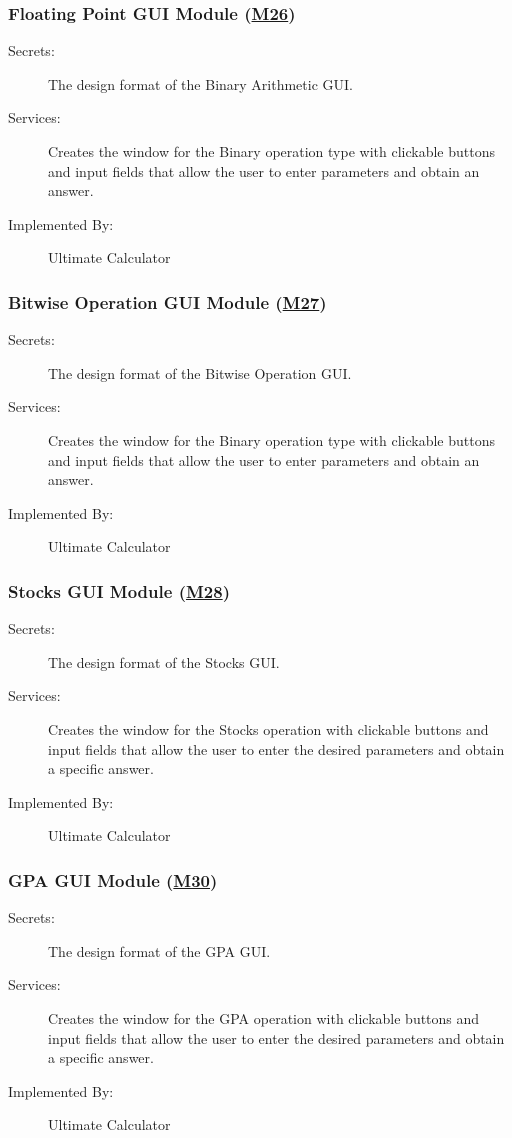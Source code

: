 \documentclass[12pt, titlepage]{article}
\begin{document}
\subsubsection{Floating Point GUI Module (\hyperref[m26]{M26})}
\begin{description}
\item[Secrets:]The design format of the Binary Arithmetic GUI.
\item[Services:] Creates the window for the Binary operation type with clickable buttons and input fields that allow the user to enter parameters and obtain an answer.
\item[Implemented By:] Ultimate Calculator
\end{description}

\subsubsection{Bitwise Operation GUI Module (\hyperref[m27]{M27})}
\begin{description}
\item[Secrets:]The design format of the Bitwise Operation GUI.
\item[Services:] Creates the window for the Binary operation type with clickable buttons and input fields that allow the user to enter parameters and obtain an answer.
\item[Implemented By:] Ultimate Calculator
\end{description}

\subsubsection{Stocks GUI Module (\hyperref[m28]{M28})}
\begin{description}
\item[Secrets:]The design format of the Stocks GUI.
\item[Services:] Creates the window for the Stocks operation with clickable buttons and input fields that allow the user to enter the desired parameters and obtain a specific answer.
\item[Implemented By:] Ultimate Calculator
\end{description}

\subsubsection{GPA GUI Module (\hyperref[m30]{M30})}
\begin{description}
\item[Secrets:]The design format of the GPA GUI.
\item[Services:] Creates the window for the GPA operation with clickable buttons and input fields that allow the user to enter the desired parameters and obtain a specific answer.
\item[Implemented By:] Ultimate Calculator
\end{description}
\end{document}
